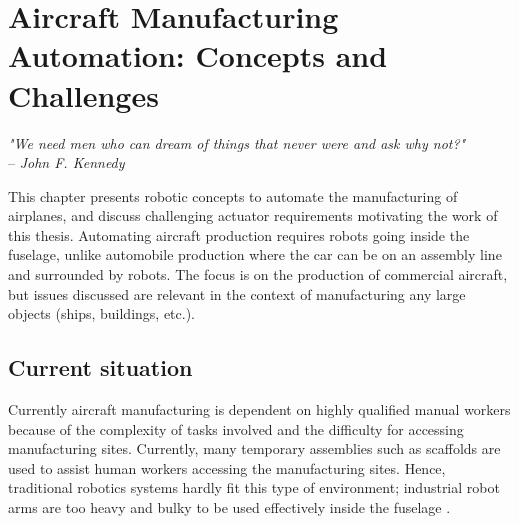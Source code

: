 \chapter{Aircraft Manufacturing Automation: Concepts and Challenges}
\label{sec:VisionForAircraftManufacturingAutomation}

\begin{flushright}
{
\textit{"We need men who can dream of things that never were and ask why not?"}\\
  -- \emph{John F. Kennedy}
%
}
\end{flushright}
\vspace{+10pt}

This chapter presents robotic concepts to automate the manufacturing of airplanes, and discuss challenging actuator requirements motivating the work of this thesis. Automating aircraft production requires robots going inside the fuselage, unlike automobile production where the car can be on an assembly line and surrounded by robots. The focus is on the production of commercial aircraft, but issues discussed are relevant in the context of manufacturing any large objects (ships, buildings, etc.).



\section{Current situation}
\label{sec:CurrentSituation}


Currently aircraft manufacturing is dependent on highly qualified manual workers because of the complexity of tasks involved and the difficulty for accessing manufacturing sites. Currently, many temporary assemblies such as scaffolds are used to assist human workers accessing the manufacturing sites. Hence, traditional robotics systems hardly fit this type of environment; industrial robot arms are too heavy and bulky to be used effectively inside the fuselage \cite{parietti_supernumerary_2014} \cite{menon_design_2011}. 

